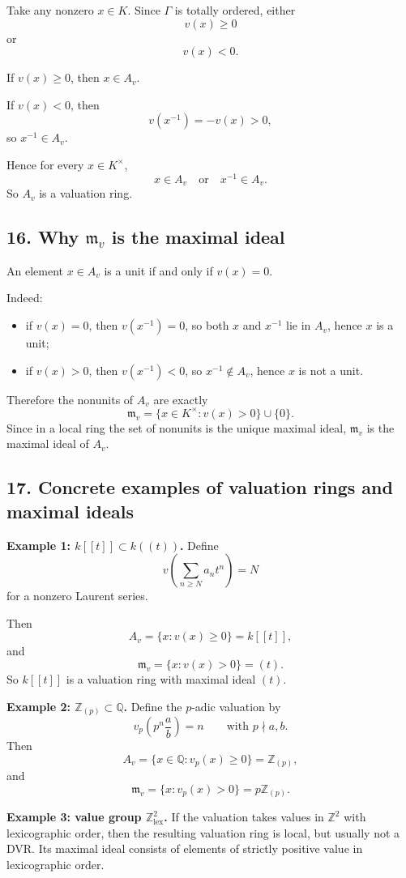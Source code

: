 \documentclass[12pt,a4paper]{article}
\theoremstyle{notespace}
\begin{document}
Take any nonzero \(x\in K\). Since \(\Gamma\) is totally ordered, either
\[
v(x)\ge 0
\]
or
\[
v(x)<0.
\]

If \(v(x)\ge 0\), then \(x\in A_v\).

If \(v(x)<0\), then
\[
v(x^{-1})=-v(x)>0,
\]
so \(x^{-1}\in A_v\).

Hence for every \(x\in K^\times\),
\[
x\in A_v \quad \text{or} \quad x^{-1}\in A_v.
\]
So \(A_v\) is a valuation ring.

\subsection{16. Why \(\mathfrak m_v\) is the maximal ideal}

An element \(x\in A_v\) is a unit if and only if \(v(x)=0\).

Indeed:
\begin{itemize}
	\item if \(v(x)=0\), then \(v(x^{-1})=0\), so both \(x\) and \(x^{-1}\) lie in \(A_v\), hence \(x\) is a unit;
	\item if \(v(x)>0\), then \(v(x^{-1})<0\), so \(x^{-1}\notin A_v\), hence \(x\) is not a unit.
\end{itemize}

Therefore the nonunits of \(A_v\) are exactly
\[
\mathfrak m_v=\{x\in K^\times : v(x)>0\}\cup\{0\}.
\]
Since in a local ring the set of nonunits is the unique maximal ideal, \(\mathfrak m_v\) is the maximal ideal of \(A_v\).

\subsection{17. Concrete examples of valuation rings and maximal ideals}

\textbf{Example 1: \(k[[t]]\subset k((t))\).}
Define
\[
v\!\left(\sum_{n\ge N} a_n t^n\right)=N
\]
for a nonzero Laurent series.

Then
\[
A_v=\{x : v(x)\ge 0\}=k[[t]],
\]
and
\[
\mathfrak m_v=\{x : v(x)>0\}=(t).
\]
So \(k[[t]]\) is a valuation ring with maximal ideal \((t)\).

\textbf{Example 2: \(\mathbb Z_{(p)}\subset \mathbb Q\).}
Define the \(p\)-adic valuation by
\[
v_p\!\left(p^n \frac ab\right)=n
\qquad \text{with } p\nmid a,b.
\]
Then
\[
A_v=\{x\in \mathbb Q : v_p(x)\ge 0\}=\mathbb Z_{(p)},
\]
and
\[
\mathfrak m_v=\{x : v_p(x)>0\}=p\mathbb Z_{(p)}.
\]

\textbf{Example 3: value group \(\mathbb Z^2_{\mathrm{lex}}\).}
If the valuation takes values in \(\mathbb Z^2\) with lexicographic order, then the resulting valuation ring is local, but usually not a DVR. Its maximal ideal consists of elements of strictly positive value in lexicographic order.
\end{document}
